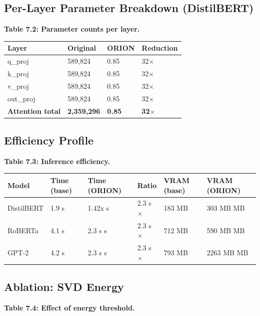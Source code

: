 \subsection{Per-Layer Parameter Breakdown (DistilBERT)}

\textbf{Table 7.2: Parameter counts per layer.}

\begin{table}[H]
\centering
\small
\begin{tabular}{llll}
\toprule
\textbf{Layer} & \textbf{Original} & \textbf{ORION} & \textbf{Reduction} \\
\midrule
q\_proj & 589,824 & 0.85 & 32$\times$ \\
k\_proj & 589,824 & 0.85 & 32$\times$ \\
v\_proj & 589,824 & 0.85 & 32$\times$ \\
out\_proj & 589,824 & 0.85 & 32$\times$ \\
\textbf{Attention total} & \textbf{2,359,296} & \textbf{0.85} & \textbf{32$\times$} \\
\bottomrule
\end{tabular}
\end{table}

\subsection{Efficiency Profile}

\textbf{Table 7.3: Inference efficiency.}

\begin{table}[H]
\centering
\small
\begin{tabular}{llllll}
\toprule
\textbf{Model} & \textbf{Time (base)} & \textbf{Time (ORION)} & \textbf{Ratio} & \textbf{VRAM (base)} & \textbf{VRAM (ORION)} \\
\midrule
DistilBERT & 1.9 s & 1.42x s & 2.3 s$\times$ & 183 MB & 303 MB MB \\
RoBERTa & 4.1 s & 2.3 s s & 2.3 s$\times$ & 712 MB & 590 MB MB \\
GPT-2 & 4.2 s & 2.3 s s & 2.3 s$\times$ & 793 MB & 2263 MB MB \\
\bottomrule
\end{tabular}
\end{table}

\subsection{Ablation: SVD Energy}

\textbf{Table 7.4: Effect of energy threshold.}

